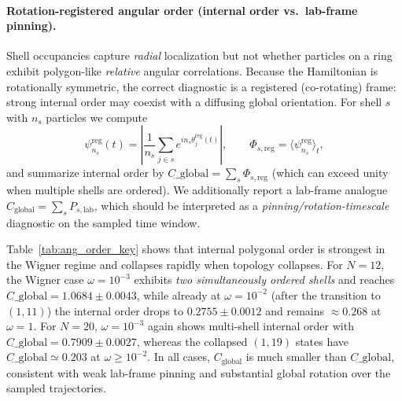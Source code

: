 \documentclass[superscriptaddress,unsortedaddress,amsmath,amssymb,aps]{revtex4-2}
\begin{document}
\paragraph{Rotation-registered angular order (internal order vs.\ lab-frame pinning).}
Shell occupancies capture \emph{radial} localization but not whether particles on a ring exhibit polygon-like
\emph{relative} angular correlations. Because the Hamiltonian is rotationally symmetric, the correct diagnostic is
a registered (co-rotating) frame: strong internal order may coexist with a diffusing global orientation. For shell
$s$ with $n_s$ particles we compute
\begin{equation}
\psi_{n_s}^{\mathrm{reg}}(t)
=
\left|
\frac{1}{n_s}\sum_{j\in s} e^{i n_s \theta^{\mathrm{reg}}_j(t)}
\right|,
\qquad
\Phi_{s,\mathrm{reg}}=\langle \psi_{n_s}^{\mathrm{reg}} \rangle_t,
\end{equation}
and summarize internal order by
$C_{\tilde{}}\_{\mathrm{global}}=\sum_s \Phi_{s,\mathrm{reg}}$ (which can exceed unity when multiple shells are ordered).
We additionally report a lab-frame analogue $C_{\mathrm{global}}=\sum_s P_{s,\mathrm{lab}}$, which should be interpreted
as a \emph{pinning/rotation-timescale} diagnostic on the sampled time window.

Table~\ref{tab:ang_order_key} shows that internal polygonal order is strongest in the Wigner regime and collapses
rapidly when topology collapses.
For $N=12$, the Wigner case $\omega=10^{-3}$ exhibits \emph{two simultaneously ordered shells} and reaches
$C_{\tilde{}}\_{\mathrm{global}}=1.0684\pm0.0043$, while already at $\omega=10^{-2}$ (after the transition to $(1,11)$)
the internal order drops to $0.2755\pm0.0012$ and remains $\approx 0.268$ at $\omega=1$.
For $N=20$, $\omega=10^{-3}$ again shows multi-shell internal order with $C_{\tilde{}}\_{\mathrm{global}}=0.7909\pm0.0027$,
whereas the collapsed $(1,19)$ states have $C_{\tilde{}}\_{\mathrm{global}}\simeq 0.203$ at $\omega\ge 10^{-2}$.
In all cases, $C_{\mathrm{global}}$ is much smaller than $C_{\tilde{}}\_{\mathrm{global}}$, consistent with weak
lab-frame pinning and substantial global rotation over the sampled trajectories.
\end{document}
